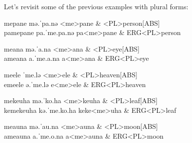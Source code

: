 Let's revisit some of the previous examples with plural forms:

\begin{subexamples}
  \ex
    \preamble mepane
    \pronunciation mə.ˈpa.nə
    \gloss
      <me>pane & <PL>person[ABS] \\
  \ex
    \preamble pamepane
    \pronunciation pa.ˈme.pa.nə
    \gloss
      pa\allo <me>pane & ERG\allo <PL>person \\
\end{subexamples}

\begin{subexamples}
  \ex
    \preamble meana
    \pronunciation mə.ˈa.na
    \gloss
      <me>ana & <PL>eye[ABS] \\
  \ex
    \preamble ameana
    \pronunciation a.ˈme.a.na
    \gloss
      a\allo <me>ana & ERG\allo <PL>eye \\
\end{subexamples}


\begin{subexamples}
  \label{ex:double-schwa}
  \ex
  \preamble meele
  \pronunciation ˈme.lə
  \gloss
    <me>ele & <PL>heaven[ABS] \\
  \ex
    \label{ex:double-schwa-erg}
    \preamble emeele
    \pronunciation ə.ˈme.lə
    \gloss
      e\allo <me>ele & ERG\allo <PL>heaven \\
\end{subexamples}


\begin{subexamples}
  \ex
    \preamble mekeuha
    \pronunciation mə.ˈko.ha
    \gloss
      <me>keuha & <PL>leaf[ABS] \\
  \ex
    \preamble kemekeuha
    \pronunciation kə.ˈme.ko.ha
    \gloss
      ke\allo ke<me>uha & ERG\allo <PL>leaf \\
\end{subexamples}

\begin{subexamples}
  \ex
    \preamble meauna
    \pronunciation mə.ˈau.na
    \gloss
      <me>auna & <PL>moon[ABS] \\
  \ex
    \preamble ameauna
    \pronunciation a.ˈme.o.na
    \gloss
      a\allo <me>auna & ERG\allo <PL>moon \\
    \end{subexamples}

